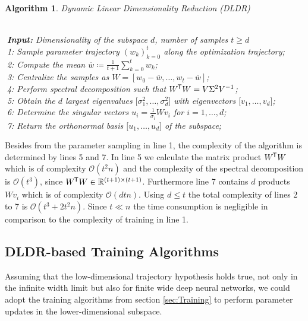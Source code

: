 \documentclass[11pt, a4paper]{article}
\newtheorem{algorithm}[theorem]{Algorithm}
\newcommand{\R}{\mathbb{R}}
\renewcommand{\O}{\mathcal{O}}
\newcommand*{\tr}{^{\mkern-1.5mu\mathsf{T}}}
\begin{document}
\begin{algorithm}
\caption{Dynamic Linear Dimensionality Reduction (DLDR) \textcolor{white}{$\Big |$}} \ \\
\textcolor{white}{$\Big |$}\textbf{Input:} Dimensionality of the subspace $d$, number of samples $t \geq d$ \\
\textcolor{white}{$\Big |$}1: Sample parameter trajectory $(w_k)_{k=0}^{t}$ along the optimization trajectory; \\
\textcolor{white}{$\Big |$}2: Compute the mean $\overline{w} \coloneq \frac{1}{t+1} \sum_{k=0}^{t} w_k$; \\
\textcolor{white}{$\Big |$}3: Centralize the samples as $W = [w_0-\overline{w}, \dots, w_t - \overline{w}]$; \\
\textcolor{white}{$\Big |$}4: Perform spectral decomposition such that $W\tr W = V \Sigma^2 V^{-1}$;  \\
\textcolor{white}{$\Big |$}5: Obtain the $d$ largest eigenvalues $\big [\sigma_1^2, \dots, \sigma_d^2 \big ]$ with eigenvectors $ \big [v_1, \dots, v_d \big ]$; \\
\textcolor{white}{$\Big |$}6: Determine the singular vectors $u_i = \frac{1}{\sigma_i}Wv_i$ for $i=1, \dots, d$; \\
\textcolor{white}{$\Big |$}7: Return the orthonormal basis $ \big [u_1, \dots, u_d \big ]$ of the subspace;
\end{algorithm}

Besides from the parameter sampling in line 1, the complexity of the algorithm is determined by lines 5 and 7. In line 5 we calculate the matrix product $W \tr W$ which is of complexity $\O(t^2n)$ and the complexity of the spectral decomposition is $\O(t^3)$, since $W\tr W \in \R^{(t+1) \times (t+1)}$. Furthermore line 7 contains $d$ products $Wv_i$ which is of complexity $\O(dtn)$. Using $d\leq t$ the total complexity of lines 2 to 7 is $\O(t^3 + 2t^2n)$. Since $t \ll n$ the time consumption is negligible in comparison to the complexity of training in line 1.

\subsection{DLDR-based Training Algorithms}

Assuming that the low-dimensional trajectory hypothesis holds true, not only in the infinite width limit but also for finite wide deep neural networks, we could adopt the training algorithms from section \ref{sec:Training} to perform parameter updates in the lower-dimensional subspace. \\
\end{document}
